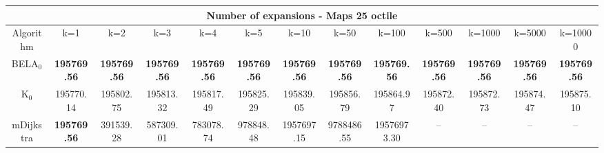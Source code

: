 \begin{tabular}{c|cccccccccccc}\toprule
\multicolumn{13}{c}{Number of expansions - Maps 25 octile}\\ \midrule
Algorithm & k=1 & k=2 & k=3 & k=4 & k=5 & k=10 & k=50 & k=100 & k=500 & k=1000 & k=5000 & k=10000 \\ \midrule
BELA$_0$ & \textbf{195769.56} & \textbf{195769.56} & \textbf{195769.56} & \textbf{195769.56} & \textbf{195769.56} & \textbf{195769.56} & \textbf{195769.56} & \textbf{195769.56} & \textbf{195769.56} & \textbf{195769.56} & \textbf{195769.56} & \textbf{195769.56} \\
K$_0$ & 195770.14 & 195802.75 & 195813.32 & 195817.49 & 195825.29 & 195839.05 & 195856.79 & 195864.97 & 195872.40 & 195872.73 & 195874.47 & 195875.10 \\
mDijkstra & \textbf{195769.56} & 391539.28 & 587309.01 & 783078.74 & 978848.48 & 1957697.15 & 9788486.55 & 19576973.30 & -- & -- & -- & -- \\ \bottomrule 
\end{tabular}
